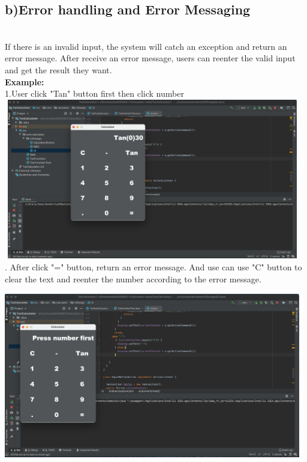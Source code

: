 \documentclass[letterpaper, 11pt]{report}
\begin{document}
\subsection*{b)Error handling and Error Messaging}\\
If there is an invalid input, the system will catch an exception and return an error message. After receive an error message, users can reenter the valid input and get the result they want.\\
\newline
\textbf{Example:}\\
\newline
1.User click "Tan" button first then click number\\
\newline
\includegraphics[width=13cm,height = 7cm]{err1}\\
. After click "=" button, return an error message. And use can use "C" button to clear the text and reenter the number according to the error message.\\
\newline
\includegraphics[width=13cm,height = 8cm]{err2}\\
\end{document}
